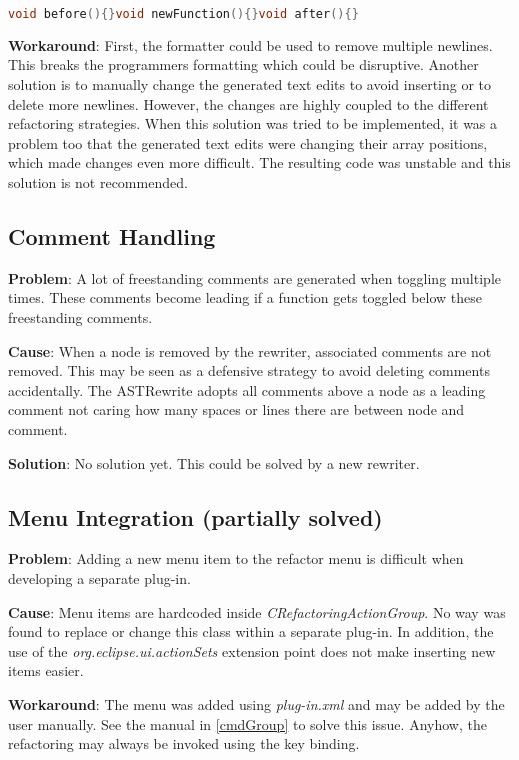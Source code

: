 \begin{lstlisting}[caption={Code without the usual newlines},
label={commentB}, language=C++]
void before(){}void newFunction(){}void after(){}
\end{lstlisting}

\textbf{Workaround}: First, the formatter could be used to remove multiple 
newlines. This breaks the programmers formatting which could be disruptive. 
Another solution is to manually change the generated text edits to avoid 
inserting or to delete more newlines. However, the changes are highly coupled to 
the different refactoring strategies. When this solution was tried to be 
implemented, it was a problem too that the generated text edits were changing 
their array positions, which made changes even more difficult. The resulting 
code was unstable and this solution is not recommended. 

\subsection{Comment Handling}
\textbf{Problem}: A lot of freestanding comments are generated when
toggling multiple times. These comments become leading if a function gets
toggled below these freestanding comments.

\textbf{Cause}: When a node is removed by the rewriter, associated comments are 
not removed. This may be seen as a defensive strategy to avoid deleting comments 
accidentally. The ASTRewrite adopts all comments above a node as a leading
comment not caring how many spaces or lines there are between node and comment.

\textbf{Solution}: No solution yet. This could be solved by a new rewriter.

\subsection{Menu Integration (partially solved)}
\textbf{Problem}: Adding a new menu item to the refactor menu is difficult when 
developing a separate plug-in.

\textbf{Cause}: Menu items are hardcoded inside
\textit{CRefactoringActionGroup}. No way was found to replace or change this 
class within a separate plug-in. In addition, the use of the 
\textit{org.eclipse.ui.actionSets} extension point does not make inserting new 
items easier.

\textbf{Workaround}: The menu was added using \textit{plug-in.xml} and may be added 
by the user manually. See the manual in \ref{cmdGroup} to solve this issue. 
Anyhow, the refactoring may always be invoked using the key binding. 


